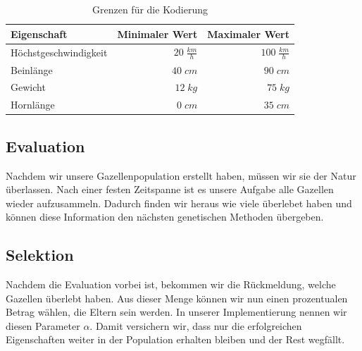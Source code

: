             \begin{table}[H]
                \begin{center}
                \begin{tabular}{ |l|r|r| } 
                    \hline
                    Eigenschaft              & Minimaler Wert        & Maximaler Wert       \\ \hline
                    Höchstgeschwindigkeit    & $ 20\; \frac{km}{h}$  & $ 100\; \frac{km}{h}$ \\ \hline
                    Beinlänge                & $ 40\; cm          $  & $ 90\; cm          $ \\ \hline
                    Gewicht                  & $ 12\; kg          $  & $ 75\; kg          $ \\ \hline
                    Hornlänge                & $  0\; cm          $  & $ 35\; cm          $ \\ \hline
                \end{tabular}
                \end{center}
                \caption{Grenzen für die Kodierung \cite{wiki:gazelle} \cite{blog:gazelle}\label{tab:gazelle-bounds}}
            \end{table}
            \noindent

        \subsection{Evaluation}
            Nachdem wir unsere Gazellenpopulation erstellt haben, müssen wir sie der Natur überlassen. Nach einer festen Zeitspanne ist es unsere Aufgabe alle Gazellen wieder aufzusammeln. Dadurch finden wir heraus wie viele überlebet haben und können diese Information den nächsten genetischen Methoden übergeben.

        \subsection{Selektion}

            Nachdem die Evaluation vorbei ist, bekommen wir die Rückmeldung, welche Gazellen überlebt haben. Aus dieser Menge können wir nun einen prozentualen Betrag wählen, die Eltern sein werden. In unserer Implementierung nennen wir diesen Parameter $\alpha$. Damit versichern wir, dass nur die erfolgreichen Eigenschaften weiter in der Population erhalten bleiben und der Rest wegfällt.


